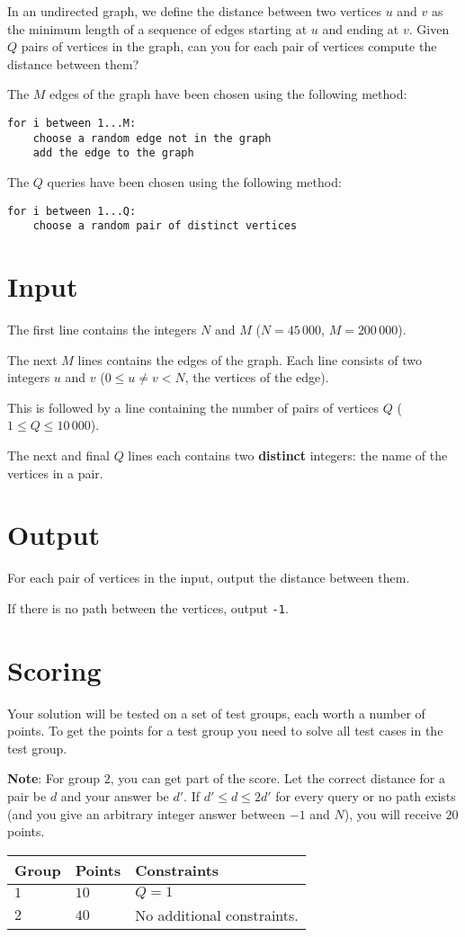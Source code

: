 In an undirected graph, we define the distance between two vertices $u$ and $v$ as the minimum length of a sequence of edges starting at $u$ and ending at $v$.
Given $Q$ pairs of vertices in the graph, can you for each pair of vertices compute the distance between them?

The $M$ edges of the graph have been chosen using the following method:
\begin{verbatim}
for i between 1...M:
    choose a random edge not in the graph
    add the edge to the graph
\end{verbatim}

The $Q$ queries have been chosen using the following method:
\begin{verbatim}
for i between 1...Q:
    choose a random pair of distinct vertices
\end{verbatim}

\section*{Input}
The first line contains the integers $N$ and $M$ ($N = 45\,000$, $M = 200\,000$). 

The next $M$ lines contains the edges of the graph.
Each line consists of two integers $u$ and $v$ ($0 \le u \neq v < N$, the vertices of the edge).

This is followed by a line containing the number of pairs of vertices $Q$ ($1 \le Q \le 10\,000$).

The next and final $Q$ lines each contains two \textbf{distinct} integers: the name of the vertices in a pair.

\section*{Output}
For each pair of vertices in the input, output the distance between them.

If there is no path between the vertices, output \texttt{-1}.

\section*{Scoring}
Your solution will be tested on a set of test groups, each worth a number of points.
To get the points for a test group you need to solve all test cases in the test group.

\textbf{Note}: For group $2$, you can get part of the score.
Let the correct distance for a pair be $d$ and your answer be $d'$.
If $d' \le d \le 2d'$ for every query or no path exists (and you give an arbitrary integer answer between $-1$ and $N$), you will receive $20$ points. 

\noindent
\begin{tabular}{| l | l | p{10cm} |}
  \hline
    \textbf{Group} & \textbf{Points} & \textbf{Constraints} \\ \hline
  $1$    & $10$       &  $Q = 1$ \\ \hline
  $2$    & $40$       & No additional constraints. \\ \hline
\end{tabular}
